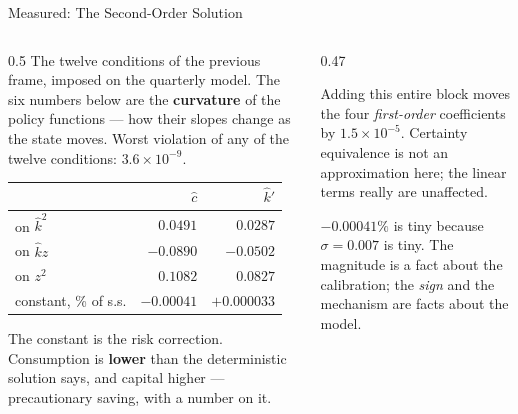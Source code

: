 \begin{frame}{Measured: The Second-Order Solution}
\begin{columns}[T]
\begin{column}{0.5\textwidth}
\small
The twelve conditions of the previous frame, imposed on the quarterly model. The six numbers below
are the \textbf{curvature} of the policy functions --- how their slopes change as the state moves.
Worst violation of any of the twelve conditions: $3.6\times10^{-9}$.
\medskip
\begin{center}\footnotesize
\begin{tabularx}{\linewidth}{@{}>{\raggedright\arraybackslash}X r r@{}}
\toprule
 & $\hat{c}$ & $\hat{k}'$ \\
\midrule
on $\hat{k}^{2}$ & $0.0491$ & $0.0287$ \\
on $\hat{k}z$ & $-0.0890$ & $-0.0502$ \\
on $z^{2}$ & $0.1082$ & $0.0827$ \\
\midrule
constant, \% of s.s. & $\mathbf{-0.00041}$ & $+0.000033$ \\
\bottomrule
\end{tabularx}
\end{center}
\medskip
The constant is the risk correction. Consumption is \textbf{lower} than the deterministic solution says, and capital higher --- precautionary saving, with a number on it.
\end{column}
\begin{column}{0.47\textwidth}
\begin{takeawaybox}\footnotesize
Adding this entire block moves the four \emph{first-order} coefficients by $1.5\times10^{-5}$. Certainty equivalence is not an approximation here; the linear terms really are unaffected.
\end{takeawaybox}
\medskip
\begin{examplebox}\footnotesize
$-0.00041\%$ is tiny because $\sigma=0.007$ is tiny. The magnitude is a fact about the calibration; the \emph{sign} and the mechanism are facts about the model.
\end{examplebox}
\end{column}
\end{columns}
\vspace{1mm}
\end{frame}

